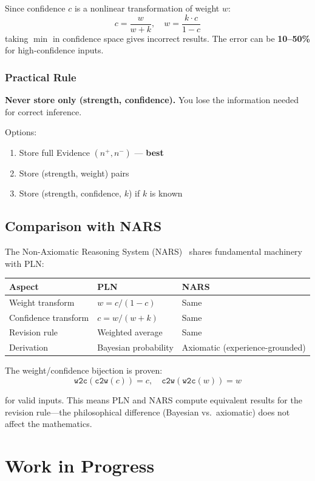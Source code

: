 \documentclass[]{article}
\begin{document}
Since confidence $c$ is a nonlinear transformation of weight $w$:
$$c = \frac{w}{w + k}, \quad w = \frac{k \cdot c}{1 - c}$$
taking $\min$ in confidence space gives incorrect results.  The error
can be \textbf{10--50\%} for high-confidence inputs.

\subsubsection{Practical Rule}
\textbf{Never store only (strength, confidence).}  You lose the
information needed for correct inference.

Options:
\begin{enumerate}
\item Store full Evidence $(n^+, n^-)$ --- \textbf{best}
\item Store (strength, weight) pairs
\item Store (strength, confidence, $k$) if $k$ is known
\end{enumerate}

\subsection{Comparison with NARS}
\label{sec:nars}
The Non-Axiomatic Reasoning System (NARS)~\cite{wang2013nal} shares
fundamental machinery with PLN:

\begin{center}
\begin{tabular}{lll}
\textbf{Aspect} & \textbf{PLN} & \textbf{NARS} \\
\hline
Weight transform & $w = c/(1-c)$ & Same \\
Confidence transform & $c = w/(w+k)$ & Same \\
Revision rule & Weighted average & Same \\
Derivation & Bayesian probability & Axiomatic (experience-grounded) \\
\end{tabular}
\end{center}

The weight/confidence bijection is proven:
$$\texttt{w2c}(\texttt{c2w}(c)) = c, \quad \texttt{c2w}(\texttt{w2c}(w)) = w$$

for valid inputs.  This means PLN and NARS compute equivalent results
for the revision rule---the philosophical difference (Bayesian vs.\
axiomatic) does not affect the mathematics.

\appendix
\section{Work in Progress}
\label{sec:wip}
\end{document}
